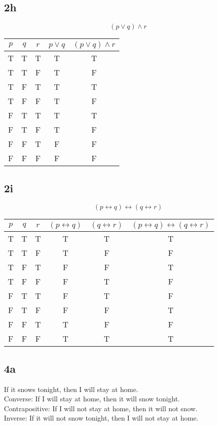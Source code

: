 \documentclass[letterpaper, 12pt]{math}
\begin{document}
\subsection*{2h}
\[ (p \vee q) \wedge r \]
\begin{center}
  \begin{tabular}{|c|c|c|c|c|}
    \hline
    \( p \) & \( q \) & \( r \) & \( p \vee q \) & \( (p \vee q) \wedge r \)
        \\ \hline
    T & T & T & T & T \\ \hline
    T & T & F & T & F \\ \hline
    T & F & T & T & T \\ \hline
    T & F & F & T & F \\ \hline
    F & T & T & T & T \\ \hline
    F & T & F & T & F \\ \hline
    F & F & T & F & F \\ \hline
    F & F & F & F & F \\ \hline
  \end{tabular}
\end{center}

\subsection*{2i}
\[ (p \leftrightarrow q) \leftrightarrow (q \leftrightarrow r) \]
\begin{center}
  \begin{tabular}{|c|c|c|c|c|c|}
    \hline
    \( p \) & \( q \) & \( r \) & \( (p \leftrightarrow q) \) &
    \( (q \leftrightarrow r) \) &
    \( (p \leftrightarrow q) \leftrightarrow (q \leftrightarrow r) \) \\ \hline
    T & T & T & T & T & T \\ \hline
    T & T & F & T & F & F \\ \hline
    T & F & T & F & F & T \\ \hline
    T & F & F & F & T & F \\ \hline
    F & T & T & F & T & F \\ \hline
    F & T & F & F & F & T \\ \hline
    F & F & T & T & F & F \\ \hline
    F & F & F & T & T & T \\ \hline
  \end{tabular}
\end{center}

\subsection*{4a}
If it snows tonight, then I will stay at home. \\
Converse: If I will stay at home, then it will snow tonight. \\
Contrapositive: If I will not stay at home, then it will not snow. \\
Inverse: If it will not snow tonight, then I will not stay at home.
\end{document}
